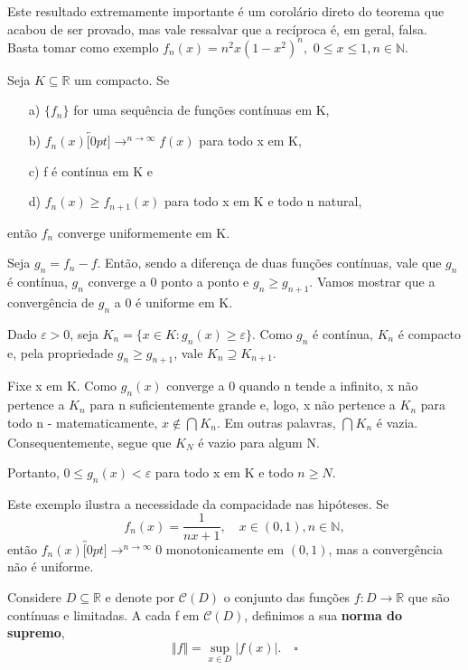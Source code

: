 \documentclass[../analysis_notes.tex]{subfiles}
\begin{document}
Este resultado extremamente importante é um corolário direto do teorema que acabou de ser provado, mas vale ressalvar que a recíproca é, em geral, falsa. Basta tomar como exemplo \(f_{n}(x)=n^{2}x(1-x^{2})^{n},\) \(0\leq x\leq 1, n\in \mathbb{N}.\)
\begin{theorem*}
	Seja \(K\subseteq \mathbb{R}\) um compacto. Se
	\begin{itemize}
		\item[a)] \(\{f_{n}\}\) for uma sequência de funções contínuas em K,
		\item[b)] \(f_{n}(x)\overbracket[0pt]{\longrightarrow}^{n\to \infty}f(x)\) para todo x em K,
		\item[c)] f é contínua em K e
		\item[d)]\(f_{n}(x)\geq f_{n+1}(x)\) para todo x em K e todo n natural,
	\end{itemize}
	então \(f_{n}\) converge uniformemente em K.
\end{theorem*}
\begin{proof*}
	Seja \(g_{n}=f_{n}-f\). Então, sendo a diferença de duas funções contínuas, vale que \(g_{n}\) é contínua, \(g_{n}\) converge a 0 ponto a ponto e \(g_{n}\geq g_{n+1}\). Vamos mostrar que a convergência de \(g_{n}\) a 0 é uniforme em K.

	Dado \(\varepsilon >0\), seja \(K_{n}=\{x\in K: g_{n}(x)\geq \varepsilon \}\). Como \(g_{n}\) é contínua, \(K_{n}\) é compacto e, pela propriedade \(g_{n}\geq g_{n+1}\), vale \(K_{n}\supseteq K_{n+1}\).

	Fixe x em K. Como \(g_{n}(x)\) converge a 0 quando n tende a infinito, x não pertence a \(K_{n}\) para n suficientemente grande e, logo, x não pertence a \(K_{n}\) para todo n - matematicamente, \(x\not\in \bigcap_{}^{}K_{n}\). Em outras palavras, \(\bigcap_{}^{}K_{n}\) é vazia. Consequentemente, segue que \(K_{N}\) é vazio para algum N.

	Portanto, \(0\leq g_{n}(x)<\varepsilon \) para todo x em K e todo \(n\geq N.\) \qedsymbol
\end{proof*}
\begin{example}
	Este exemplo ilustra a necessidade da compacidade nas hipóteses. Se
	\[
		f_{n}(x)=\frac{1}{nx+1}, \quad x\in(0, 1), n\in \mathbb{N},
	\]
	então \(f_{n}(x)\overbracket[0pt]{\longrightarrow}^{n\to \infty}0\) monotonicamente em \((0,1)\), mas a convergência não é uniforme.
\end{example}
\begin{def*}
	Considere \(D\subseteq \mathbb{R}\) e denote por \(\mathcal{C}(D)\) o conjunto das funções \(f:D\rightarrow \mathbb{R}\) que são contínuas e limitadas. A cada f em \(\mathcal{C}(D)\), definimos a sua \textbf{norma do supremo},
	\[
		\Vert f \Vert=\sup_{x\in D}|f(x)|. \quad \square
	\]
\end{def*}
\end{document}
